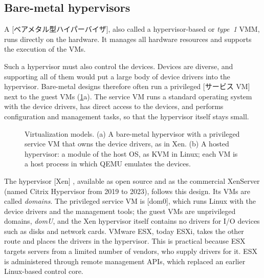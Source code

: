 \documentclass[../main.tex]{subfiles}
\begin{document}
\subsection{Bare-metal hypervisors}

\begin{definition}
  A [ベアメタル型ハイパーバイザ], also called a
  hypervisor-based or \emph{type~1} VMM, runs directly on the hardware.  It
  manages all hardware resources and supports the execution of the VMs.
\end{definition}

Such a hypervisor must also control the devices.  Devices are diverse, and
supporting all of them would put a large body of device drivers into the
hypervisor.  Bare-metal designs therefore often run a privileged
[サービス VM] next to the guest VMs
(\cref{fig:l12-models}a).  The
service VM runs a standard operating system with the device drivers, has
direct access to the devices, and performs configuration and management
tasks, so that the hypervisor itself stays small.

\begin{figure}[htbp]
  \centering
  
  \caption{Virtualization models.  (a) A bare-metal hypervisor with a
    privileged service VM that owns the device drivers, as in Xen.  (b) A
    hosted hypervisor: a module of the host OS, as KVM in Linux; each VM is
    a host process in which QEMU emulates the devices.}
  \label{fig:l12-models}
\end{figure}

The hypervisor [Xen] \cite{barham2003}, available as open source
and as the commercial XenServer (named Citrix Hypervisor from 2019 to
2023), follows this design.  Its VMs are
called \emph{domains}.  The privileged service VM is [dom0],
which runs Linux with the device drivers and the management tools; the
guest VMs are unprivileged domains, \emph{domU}, and the Xen hypervisor
itself contains no drivers for I/O devices such as disks and network
cards.
VMware ESX, today ESXi, takes the other route and places the drivers
in the hypervisor.  This is practical because ESX targets servers from a
limited number of vendors, who supply drivers for it.  ESX is administered
through remote management APIs, which replaced an earlier Linux-based
control core.
\end{document}
